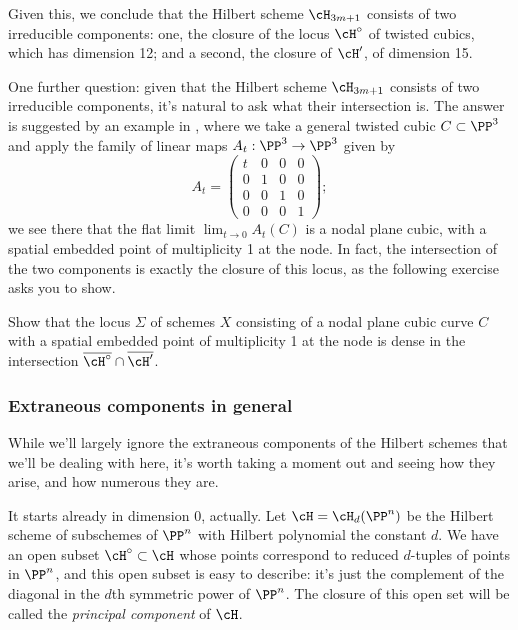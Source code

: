 Given this, we conclude that the Hilbert scheme $\cH_{3m+1}$ consists of two irreducible components: one, the closure of the locus $\cH^\circ$ of twisted cubics, which has dimension 12; and a second, the closure of $\cH'$, of dimension 15. 

One further question: given that the Hilbert scheme $\cH_{3m+1}$ consists of two irreducible components, it's natural to ask what their intersection is. The answer is suggested by an example in \cite[II.3.4]{GeomSchemes}, where we take a general twisted cubic  $C \subset \PP^3$ and apply the family of linear maps $A_t : \PP^3 \to \PP^3$ given by
$$
A_t =
\begin{pmatrix}
t & 0 & 0 & 0 \\
0 & 1 & 0 & 0 \\
0 & 0 & 1 & 0 \\
0 & 0 & 0 & 1
\end{pmatrix};
$$
we see there that the flat limit $\lim_{t \to 0} A_t(C)$ is a nodal plane cubic, with a spatial embedded point of multiplicity 1 at the node. In fact, the intersection of the two components is exactly the closure of this locus, as the following exercise asks you to show.


\begin{exercise}
Show that the locus $\Sigma$ of schemes $X$ consisting of a nodal plane cubic curve $C$ with a spatial embedded point of multiplicity 1 at the node is dense in the intersection $\overline{\cH^\circ} \cap \overline{\cH'}$.
\end{exercise}

\subsubsection{Extraneous components in general}

While we'll largely ignore the extraneous components of the Hilbert schemes that we'll be dealing with here, it's worth taking a moment out and seeing how they arise, and how numerous they are.

It starts already in dimension 0, actually. Let $\cH = \cH_d(\PP^n)$ be the Hilbert scheme of subschemes of $\PP^n$ with Hilbert polynomial the constant $d$. We have an open subset $\cH^\circ \subset \cH$ whose points correspond to reduced $d$-tuples of points in $\PP^n$, and this open subset is easy to describe: it's just the complement of the diagonal in the $d$th symmetric power of $\PP^n$. The closure of this open set will be called the \emph{principal component} of $\cH$.


